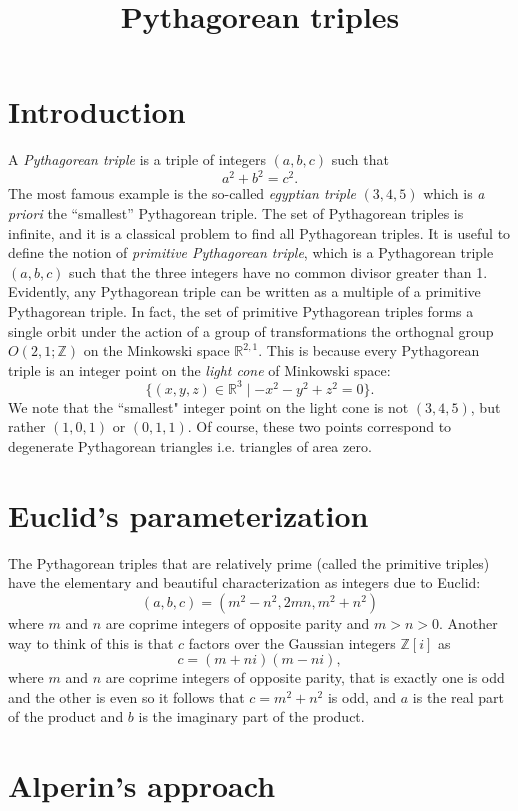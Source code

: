 \documentclass[12pt,a4paper]{amsart}
\title{Pythagorean triples}
\def\ZZ{\mathbb{Z}}
\begin{document}
\maketitle

\section{Introduction}

A \textit{Pythagorean triple} is a triple of integers $(a,b,c)$ such
that $$a^2 + b^2 = c^2.$$
The most famous example is the so-called \textit{egyptian triple}
$(3,4,5)$ which is \textit{a priori} the ``smallest'' Pythagorean triple.	
The set of Pythagorean triples is infinite, and it is a classical problem to find all Pythagorean triples. 
It is useful to define the notion of \textit{primitive Pythagorean
triple}, which is a Pythagorean triple $(a,b,c)$ such that
the three integers have no common divisor greater than 1.
Evidently, any Pythagorean triple can be written as a multiple of a primitive Pythagorean triple.
In fact, the set of primitive Pythagorean triples 
forms a single orbit under the action of a group of transformations the orthognal group $O(2,1;\ZZ)$ on the Minkowski space $\mathbb{R}^{2,1}$.
This is because every Pythagorean triple is an integer point on the
\textit{light cone} of Minkowski space: 
$$ \{ (x,y,z) \in \mathbb{R}^3 \mid -x^2 - y^2 + z^2 = 0 \}.$$
We note that the ``smallest" integer point on the light cone is not
$(3,4,5)$, but rather $(1,0,1)$ or $(0,1,1)$.
Of course, these two points correspond to degenerate Pythagorean triangles i.e. triangles of area zero.

\section{Euclid's parameterization}


The Pythagorean triples that are relatively prime (called the primitive triples) have
the elementary and beautiful characterization as integers
due to Euclid:
$$(a,b,c) = (m^2 - n^2, 2mn, m^2 + n^2)$$
where $m$ and $n$ are coprime integers of opposite parity and $m > n > 0$.
Another way to think of this is
that $c$ factors over the Gaussian integers $\mathbb{Z}[i]$ 
as 
$$c = (m+ni)(m-ni),$$ 
where $m$ and $n$ are coprime integers of opposite parity,
that is exactly one is odd and the other is even
so it follows that $c= m^2 + n^2$ is odd,
and $a$ is the real part of the product and $b$ is the imaginary part of the product.

\section{Alperin's approach}
\end{document}
